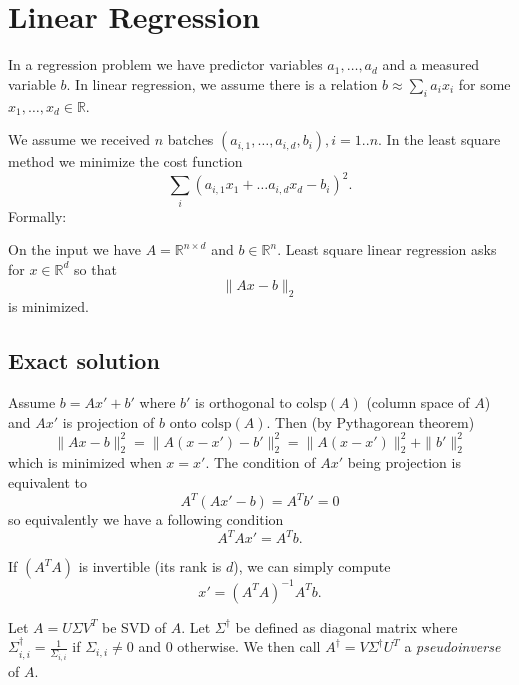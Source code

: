 \documentclass[11pt]{article}
\begin{document}
\section{Linear Regression}
In a regression problem we have predictor variables $a_1, \ldots,a_d$ and a measured variable $b$. In linear regression, we assume there is a relation $b \approx \sum_i a_i x_i$ for some $x_1,\ldots,x_d \in \mathbb{R}$.

We assume we received $n$ batches $(a_{i,1},\ldots,a_{i,d},b_i), i = 1..n$. In the least square method we minimize the cost function
$$\sum_{i} (a_{i,1}x_1 + \ldots a_{i,d} x_d - b_i)^2.$$
Formally:
\begin{definition}
On the input we have $A = \mathbb{R}^{n \times d}$ and $b \in \mathbb{R}^{n}$. Least square linear regression asks for $x \in \mathbb{R}^d$ so that
$$ \|A x - b\|_2$$
is minimized.
\end{definition}

\subsection{Exact solution}
Assume $b = Ax' + b'$ where $b'$ is orthogonal to $\textrm{colsp}(A)$ (column space of $A$) and $Ax'$ is projection of $b$ onto $\textrm{colsp}(A)$. Then (by Pythagorean theorem)
$$\|Ax-b\|_2^2 = \|A(x-x') - b'\|_2^2 = \|A(x-x')\|_2^2 + \|b'\|_2^2$$ 
which is minimized when $x=x'$. The condition of $Ax'$ being projection is equivalent to
$$A^T(Ax'-b) = A^T b' = 0$$
so equivalently we have a following condition
\begin{equation}
\label{cond1}
A^T A x' = A^T b.
\end{equation}

If $(A^T A)$ is invertible (its rank is $d$), we can simply compute  $$x' = (A^T A)^{-1} A^T b.$$

\begin{definition}
Let $A = U \Sigma V^T$ be SVD of $A$. Let $\Sigma^\dagger$ be defined as diagonal matrix where $\Sigma^\dagger_{i,i} = \frac{1}{\Sigma_{i,i}}$ if $\Sigma_{i,i} \not=0$ and $0$ otherwise. We then call $A^{\dagger} = V \Sigma^{\dagger} U^T$ a \emph{pseudoinverse} of $A$.
\end{definition}
\end{document}
